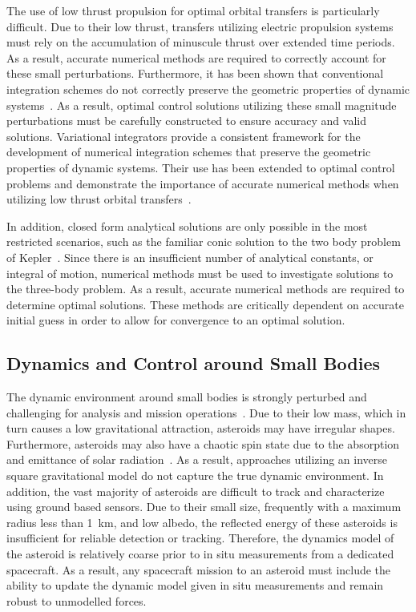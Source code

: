 The use of low thrust propulsion for optimal orbital transfers is particularly difficult.
Due to their low thrust, transfers utilizing electric propulsion systems must rely on the accumulation of minuscule thrust over extended time periods. 
As a result, accurate numerical methods are required to correctly account for these small perturbations.
Furthermore, it has been shown that conventional integration schemes do not correctly preserve the geometric properties of dynamic systems~\cite{leok2007,marsden2001}.
As a result, optimal control solutions utilizing these small magnitude perturbations must be carefully constructed to ensure accuracy and valid solutions.
Variational integrators provide a consistent framework for the development of numerical integration schemes that preserve the geometric properties of dynamic systems.
Their use has been extended to optimal control problems and demonstrate the importance of accurate numerical methods when utilizing low thrust orbital transfers~\cite{koon2004,leok2007,moore2011,gawlik2006,lee2007}.

In addition, closed form analytical solutions are only possible in the most restricted scenarios, such as the familiar conic solution to the two body problem of Kepler~\cite{bate1971}.
Since there is an insufficient number of analytical constants, or integral of motion, numerical methods must be used to investigate solutions to the three-body problem.
As a result, accurate numerical methods are required to determine optimal solutions.
These methods are critically dependent on accurate initial guess in order to allow for convergence to an optimal solution.

\subsection{Dynamics and Control around Small Bodies}

The dynamic environment around small bodies is strongly perturbed and challenging for analysis and mission operations~\cite{scheeres2012}.
Due to their low mass, which in turn causes a low gravitational attraction, asteroids may have irregular shapes.
Furthermore, asteroids may also have a chaotic spin state due to the absorption and emittance of solar radiation~\cite{rubincam2000}.
As a result, approaches utilizing an inverse square gravitational model do not capture the  true dynamic environment.
In addition, the vast majority of asteroids are difficult to track and characterize using ground based sensors.
Due to their small size, frequently with a maximum radius less than \SI{1}{\kilo\meter}, and low albedo, the reflected energy of these asteroids is insufficient for reliable detection or tracking.
Therefore, the dynamics model of the asteroid is relatively coarse prior to in situ measurements from a dedicated spacecraft.
As a result, any spacecraft mission to an asteroid must include the ability to update the dynamic model given in situ measurements and remain robust to unmodelled forces.

